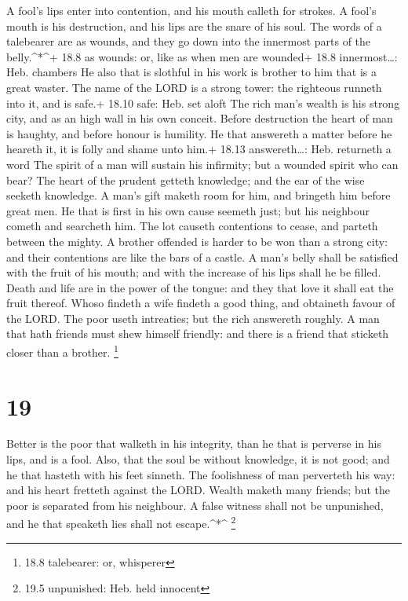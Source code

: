  A fool's lips enter into contention, and his mouth calleth
for strokes.  A fool's mouth is his destruction, and his
lips are the snare of his soul.  The words of a talebearer
are as wounds, and they go down into the innermost parts of the
belly.\^{}*\^{}+ 18.8 as wounds: or, like as when men are wounded+ 18.8
innermost\ldots: Heb. chambers  He also that is slothful in
his work is brother to him that is a great waster.  The
name of the LORD is a strong tower: the righteous runneth into it, and
is safe.+ 18.10 safe: Heb. set aloft  The rich man's wealth
is his strong city, and as an high wall in his own conceit.
 Before destruction the heart of man is haughty, and before
honour is humility.  He that answereth a matter before he
heareth it, it is folly and shame unto him.+ 18.13 answereth\ldots: Heb.
returneth a word  The spirit of a man will sustain his
infirmity; but a wounded spirit who can bear?  The heart of
the prudent getteth knowledge; and the ear of the wise seeketh
knowledge.  A man's gift maketh room for him, and bringeth
him before great men.  He that is first in his own cause
seemeth just; but his neighbour cometh and searcheth him. 
The lot causeth contentions to cease, and parteth between the mighty.
 A brother offended is harder to be won than a strong city:
and their contentions are like the bars of a castle.  A
man's belly shall be satisfied with the fruit of his mouth; and with the
increase of his lips shall he be filled.  Death and life
are in the power of the tongue: and they that love it shall eat the
fruit thereof.  Whoso findeth a wife findeth a good thing,
and obtaineth favour of the LORD.  The poor useth
intreaties; but the rich answereth roughly.  A man that
hath friends must shew himself friendly: and there is a friend that
sticketh closer than a brother. \footnote{18.8 talebearer: or, whisperer}

\hypertarget{section-18}{%
\section{19}\label{section-18}}

 Better is the poor that walketh in his integrity, than he
that is perverse in his lips, and is a fool.  Also, that the
soul be without knowledge, it is not good; and he that hasteth with his
feet sinneth.  The foolishness of man perverteth his way:
and his heart fretteth against the LORD.  Wealth maketh many
friends; but the poor is separated from his neighbour.  A
false witness shall not be unpunished, and he that speaketh lies shall
not escape.\^{}*\^{} \footnote{19.5 unpunished: Heb. held innocent}

